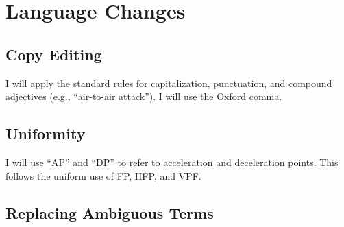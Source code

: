 \documentclass[10pt]{article}
\begin{document}
\section{Language Changes}

\subsection{Copy Editing}

I will apply the standard rules for capitalization, punctuation, and compound adjectives (e.g., “air-to-air attack”). I will use the Oxford comma.

\subsection{Uniformity}

I will use “AP” and “DP” to refer to acceleration and deceleration points. This follows the uniform use of FP, HFP, and VPF.

\subsection{Replacing Ambiguous Terms}
\end{document}
